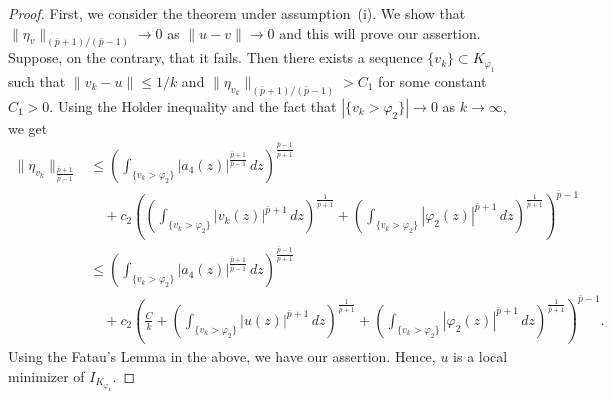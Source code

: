 \documentclass[11pt]{article}
\newcommand{\lv}{\lVert}
\newcommand{\rv}{\rVert}
\begin{document}
\begin{proof}
First, we consider the theorem under assumption~\textnormal{(i)}. We show that $\| \eta_{v} \|_{(\bar{p}+1)/(\bar{p}-1)} \to 0$ as $\lv u - v \rv \to 0$ and this will prove our assertion. Suppose, on the contrary, that it fails. Then there exists a sequence $\{v_k\} \subset K_{\varphi_1}$ such that $\| v_k - u \| \le 1/k$ and $\| \eta_{v_k} \|_{(\bar{p}+1)/(\bar{p}-1)} > C_1$ for some constant $C_1 > 0$.
Using the Holder inequality and the fact that $| \{ v_k > \varphi_2\}| \to 0 $ as $k \to \infty$, we get
\begin{equation*}
\begin{aligned}
\| \eta_{v_k} \|_{\frac{\bar{p}+1}{\bar{p}-1}}& \leq  \left( \int_{\{ v_k > \varphi_2 \}} | a_4(z) |^{\frac{\bar{p}+1}{\bar{p}-1}} \, dz \right)^{\frac{\bar{p}-1}{\bar{p}+1}}  \\
& \quad + c_2 \left( \left( \int_{\{ v_k > \varphi_2 \}} | v_k(z) |^{\bar{p}+1} \, dz \right)^{\frac{1}{\bar{p}+1}} + \left( \int_{\{ v_k > \varphi_2 \}} | \varphi_2(z) |^{\bar{p}+1} \, dz \right)^{\frac{1}{\bar{p}+1}}
\right)^{\bar{p}-1}\\
& \leq  \left( \int_{\{ v_k > \varphi_2 \}} | a_4(z) |^{\frac{\bar{p}+1}{\bar{p}-1}} \, dz \right)^{\frac{\bar{p}-1}{\bar{p}+1}} \\
& {} \quad + c_2 \left(
\frac{C}{k}
+ \left( \int_{\{ v_k > \varphi_2 \}} | u(z) |^{\bar{p}+1} \, dz \right)^{\frac{1}{\bar{p}+1}}
+ \left( \int_{\{ v_k > \varphi_2 \}} | \varphi_2(z) |^{\bar{p}+1} \, dz \right)^{\frac{1}{\bar{p}+1}}
\right)^{\bar{p}-1}.
\end{aligned}
\end{equation*}
Using the Fatau's Lemma in the above, we have our assertion. Hence, $u$ is a local minimizer of $I_{K_{\varphi_1}}$.
\medskip


\end{proof}
\end{document}
